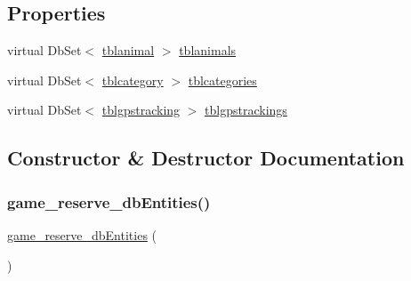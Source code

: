 \subsection*{Properties}
\begin{DoxyCompactItemize}
\item 
virtual Db\+Set$<$ \hyperlink{classWildLifeTracker_1_1tblanimal}{tblanimal} $>$ \hyperlink{classWildLifeTracker_1_1game__reserve__dbEntities_a89197034701cb1b73d5aefd7691de04d}{tblanimals}
\item 
virtual Db\+Set$<$ \hyperlink{classWildLifeTracker_1_1tblcategory}{tblcategory} $>$ \hyperlink{classWildLifeTracker_1_1game__reserve__dbEntities_a5aaa1d41e5de932e9cedbefefde0fa04}{tblcategories}
\item 
virtual Db\+Set$<$ \hyperlink{classWildLifeTracker_1_1tblgpstracking}{tblgpstracking} $>$ \hyperlink{classWildLifeTracker_1_1game__reserve__dbEntities_a9b22490ada233f3325165fbd2acebeec}{tblgpstrackings}
\end{DoxyCompactItemize}


\subsection{Constructor \& Destructor Documentation}
\mbox{\label{classWildLifeTracker_1_1game__reserve__dbEntities_a6075f6593be0d53a6314ed33bbe75cdf}} 
\subsubsection{\texorpdfstring{game\+\_\+reserve\+\_\+db\+Entities()}{game\_reserve\_dbEntities()}}
{\footnotesize\ttfamily \hyperlink{classWildLifeTracker_1_1game__reserve__dbEntities}{game\+\_\+reserve\+\_\+db\+Entities} (\begin{DoxyParamCaption}{ }\end{DoxyParamCaption})\hspace{0.3cm}{\ttfamily [inline]}}



